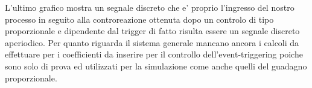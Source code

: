 \documentclass[a4paper,13pt]{article}
\begin{document}
L'ultimo grafico mostra un segnale discreto che e' proprio l'ingresso del nostro processo in seguito alla controreazione ottenuta dopo un controlo di tipo proporzionale e dipendente dal trigger di fatto  risulta essere un segnale discreto aperiodico.
Per quanto riguarda il sistema generale mancano ancora i calcoli da effettuare per i coefficienti da inserire per il controllo dell'event-triggering poiche sono solo di prova ed utilizzati per la simulazione come anche quelli del guadagno proporzionale.
\end{document}
